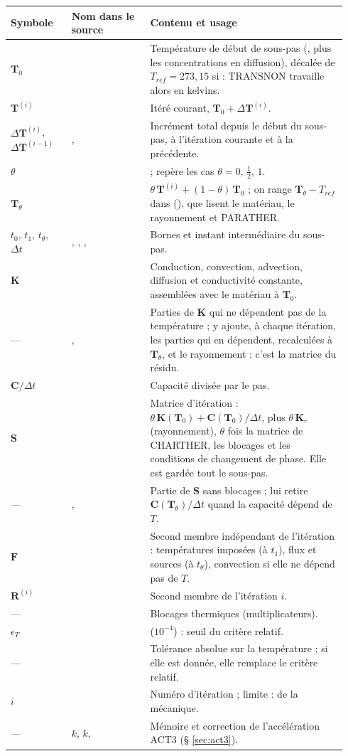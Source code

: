 \documentclass[11pt,a4paper]{article}
\makeatletter
\numberwithin{equation}{section}
\newcommand{\src}[1]{\texttt{\detokenize{#1}}}          %
\newcommand{\pr}[1]{\textsf{#1}}                        %
\newcommand{\op}[1]{\textsf{\small #1}}                 %
\newcommand{\vc}[1]{\symbf{#1}}                         %
\newenvironment{glossaire}[1][Glossaire]{%
  \par\smallskip\needspace{7\baselineskip}\noindent{\sffamily\bfseries\small #1}\par\nopagebreak
  \small
  \renewcommand{\arraystretch}{1.18}
  \begin{longtable}{@{}>{\raggedright\arraybackslash}p{0.17\linewidth}
                     >{\raggedright\arraybackslash}p{0.22\linewidth}
                     >{\raggedright\arraybackslash}p{0.555\linewidth}@{}}
  \toprule
  \textbf{Symbole} & \textbf{Nom dans le source} & \textbf{Contenu et usage}\\
  \midrule\endhead
  \bottomrule\endfoot}
  {\end{longtable}\addtocounter{table}{-1}\normalsize\vspace{-0.4em}}
\makeatother
\begin{document}
\begin{glossaire}[Glossaire — TRANSNON]
$\vc T_0$ & \src{U0} & Température de début de sous-pas (\src{CONTI.'TEMPERATURES'}, plus les concentrations en diffusion), décalée de $T_{ref} = 273{,}15$ si \src{CELSIUS} : \pr{TRANSNON} travaille alors en kelvins.\\
$\vc T^{(i)}$ & \src{U1} & Itéré courant, $\vc T_0 + \Delta\vc T^{(i)}$.\\
$\Delta\vc T^{(i)}$, $\Delta\vc T^{(i-1)}$ & \src{DU1}, \src{DU0} & Incrément total depuis le début du sous-pas, à l'itération courante et à la précédente.\\
$\theta$ & \src{LAMBDA1} & \src{RELAXATION_THETA} ; \src{I_LAMBD1} repère les cas $\theta = 0$, $\tfrac12$, $1$.\\
$\vc T_\theta$ & \src{U_BOU1} & $\theta\,\vc T^{(i)} + (1-\theta)\,\vc T_0$ ; on range $\vc T_\theta - T_{ref}$ dans \src{ETAB.'THER_COURANT'} (\src{TH_COUR}), que lisent le matériau, le rayonnement et \pr{PARATHER}.\\
$t_0$, $t_1$, $t_\theta$, $\Delta t$ & \src{TEM0}, \src{TEM1}, \src{TEMM}, \src{T_PAS} & Bornes et instant intermédiaire du sous-pas.\\
$\vc K$ & \src{KDETO} & Conduction, convection, advection, diffusion et conductivité constante, assemblées avec le matériau à $\vc T_0$.\\
— & \src{BCONS}, \src{BB} & Parties de $\vc K$ qui ne dépendent pas de la température ; \src{BB} y ajoute, à chaque itération, les parties qui en dépendent, recalculées à $\vc T_\theta$, et le rayonnement : c'est la matrice du résidu.\\
$\vc C/\Delta t$ & \src{CDET} & Capacité divisée par le pas.\\
$\vc S$ & \src{AA} & Matrice d'itération : $\theta\,\vc K(\vc T_0) + \vc C(\vc T_0)/\Delta t$, plus $\theta\,\vc K_r$ (rayonnement), $\theta$ fois la matrice de \pr{CHARTHER}, les blocages et les conditions de changement de phase. Elle est gardée tout le sous-pas.\\
— & \src{CCONS}, \src{CC} & Partie de $\vc S$ sans blocages ; \src{CC} lui retire $\vc C(\vc T_\theta)/\Delta t$ quand la capacité dépend de $T$.\\
$\vc F$ & \src{SECON} & Second membre indépendant de l'itération : températures imposées (à $t_1$), flux et sources (à $t_\theta$), convection si elle ne dépend pas de $T$.\\
$\vc R^{(i)}$ & \src{MAT_CHPO} & Second membre de l'itération $i$.\\
— & \src{MAT_BLOC} & Blocages thermiques (multiplicateurs).\\
$\epsilon_T$ & \src{ZPREC1} & \src{PRECISION} ($10^{-4}$) : seuil du critère relatif.\\
— & \src{TTOL} & Tolérance absolue sur la température ; si elle est donnée, elle remplace le critère relatif.\\
$i$ & \src{ITE_IT} & Numéro d'itération ; limite : \src{MAXITERATION} de la mécanique.\\
— & \src{ACFP}$k$, \src{ACFEP}$k$, \src{CORREC} & Mémoire et correction de l'accélération \op{ACT3} (§ \ref{sec:act3}).\\
\end{glossaire}
\end{document}
